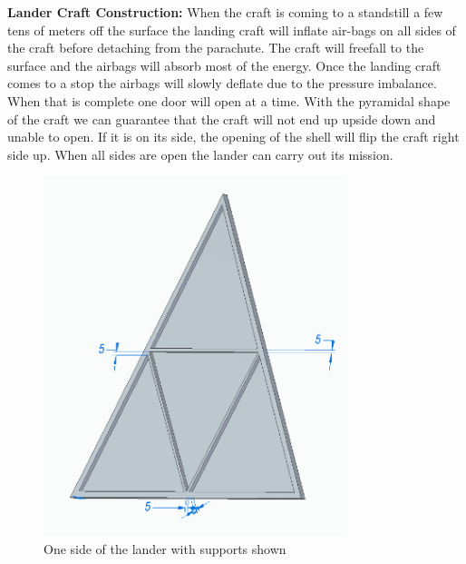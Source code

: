 \documentclass[%
 portrait,
 aapm,
 mph,%
 amsmath,amssymb,
 reprint,%
]{revtex4-2}
\begin{document}
\textbf{Lander Craft Construction:} When the craft is coming to a standstill a few tens of meters off the surface the landing craft will inflate air-bags on all sides of the craft before detaching from the parachute.  The craft will freefall to the surface and the airbags will absorb most of the energy.  Once the landing craft comes to a stop the airbags will slowly deflate due to the pressure imbalance.  When that is complete one door will open at a time.  With the pyramidal shape of the craft we can guarantee that the craft will not end up upside down and unable to open.  If it is on its side, the opening of the shell will flip the craft right side up.  When all sides are open the lander can carry out its mission.
\begin{figure}[h!]
  \includegraphics[width=250pt]{DescentandLanding/LandingCraftSide.png}
   \caption{One side of the lander with supports shown}
\end{figure} 
\end{document}
